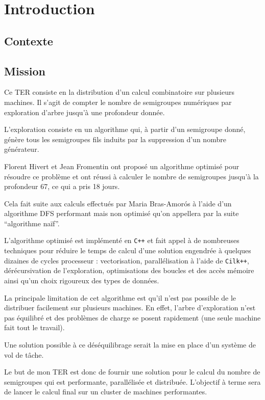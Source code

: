 \documentclass[12pt,a4paper]{article}
\begin{document}
\section*{Introduction}

\subsection*{Contexte}

\subsection*{Mission}
Ce TER consiste en la distribution d'un calcul combinatoire sur plusieurs machines. Il s'agit de compter le nombre de semigroupes numériques par exploration d'arbre jusqu'à une profondeur donnée.

L'exploration consiste en un algorithme qui, à partir d'un semigroupe donné, génère tous les semigroupes fils induits par la suppression d'un nombre générateur.

Florent Hivert et Jean Fromentin ont proposé un algorithme optimisé pour résoudre ce problème et ont réussi à calculer le nombre de semigroupes jusqu'à la profondeur 67, ce qui a pris 18 jours.

Cela fait suite aux calculs effectués par Maria Bras-Amorós à l'aide d'un algorithme DFS performant mais non optimisé qu'on appellera par la suite ``algorithme naïf''.

L'algorithme optimisé est implémenté en \texttt{C++} et fait appel à de nombreuses techniques pour réduire le temps de calcul d'une solution engendrée à quelques dizaines de cycles processeur : vectorisation, parallélisation à l'aide de \texttt{Cilk++}, dérécursivation de l'exploration, optimisations des boucles et des accès mémoire ainsi qu'un choix rigoureux des types de données.

La principale limitation de cet algorithme est qu'il n'est pas possible de le distribuer facilement sur plusieurs machines. En effet, l'arbre d'exploration n'est pas équilibré et des problèmes de charge se posent rapidement (une seule machine fait tout le travail).

Une solution possible à ce déséquilibrage serait la mise en place d'un système de vol de tâche.

Le but de mon TER est donc de fournir une solution pour le calcul du nombre de semigroupes qui est performante, parallélisée et distribuée. L'objectif à terme sera de lancer le calcul final sur un cluster de machines performantes.
\end{document}
